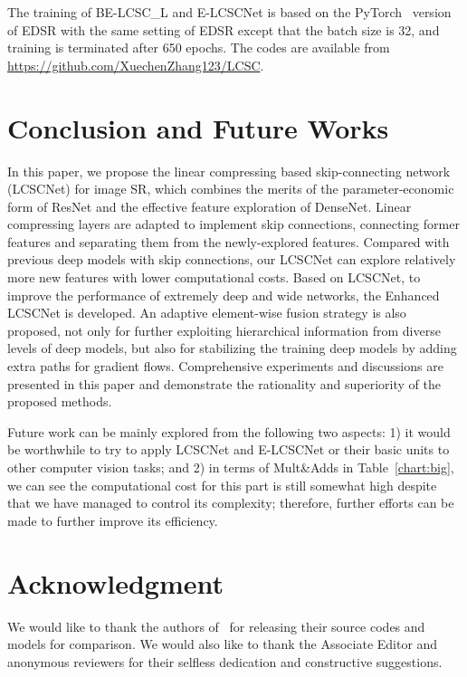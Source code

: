 \documentclass[journal]{IEEEtran}
\begin{document}
The training of BE-LCSC\_L and E-LCSCNet is based on the PyTorch~\cite{paszke2017pytorch} version of EDSR with the same setting of EDSR except that the batch size is 32, and training is terminated after 650 epochs. The codes are available from \url{https://github.com/XuechenZhang123/LCSC}. 


\section{Conclusion and Future Works}\label{s:s_8}

In this paper, we propose the linear compressing based skip-connecting network (LCSCNet) for image SR, which combines the merits of the parameter-economic form of ResNet and the effective feature exploration of DenseNet. Linear compressing layers are adapted to implement skip connections, connecting former features and separating them from the newly-explored features. Compared with previous deep models with skip connections, our LCSCNet can explore relatively more new features with lower computational costs. Based on LCSCNet, to improve the performance of extremely deep and wide networks, the Enhanced LCSCNet is developed. An adaptive element-wise fusion strategy is also proposed, not only for further exploiting hierarchical information from diverse levels of deep models, but also for stabilizing the training deep models by adding extra paths for gradient flows. Comprehensive experiments and discussions are presented in this paper and demonstrate the rationality and superiority of the proposed methods. 

Future work can be mainly explored from the following two aspects:
1) it would be worthwhile to try to apply LCSCNet and E-LCSCNet or their basic units to other computer vision tasks;
and 2) in terms of Mult\&Adds in Table~\ref{chart:big}, we can see the computational cost for this part is still somewhat high despite that we have managed to control its complexity; therefore, further efforts can be made to further improve its efficiency. 



\section*{Acknowledgment}
We would like to thank the authors of~\cite{kim2016accurate, kim2016deeply, LapSRN, tai2017image, Tai-MemNet-2017,ahn2018fast,lim2017enhanced,zhang2018residual} for releasing their source codes and models for comparison. We would also like to thank the Associate Editor and anonymous reviewers for their selfless dedication and constructive suggestions.




\end{document}
